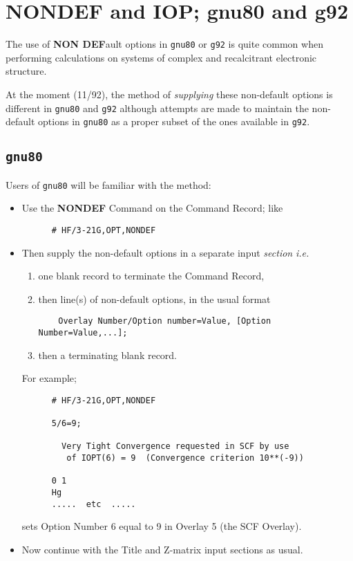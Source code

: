 
\section{\sf NONDEF and IOP; gnu80 and g92}
The use of {\bf NON DEF}ault options in {\tt gnu80} or {\tt g92} is quite
common when performing calculations on systems of complex
and recalcitrant electronic structure.

At the moment (11/92), the method of {\em supplying} these non-default
options is different in {\tt gnu80} and {\tt g92} although attempts are
made to maintain the non-default options in {\tt gnu80} as a proper
subset of the ones available in {\tt g92}.
\subsection{\tt gnu80}
Users of {\tt gnu80} will be familiar with the method:
\begin{itemize}
\item
Use the {\bf NONDEF} Command on the Command Record; like
\begin{verbatim}
      # HF/3-21G,OPT,NONDEF
\end{verbatim}
\item
Then supply the non-default options in a separate input {\em section}
{\em i.e.} 
\begin{enumerate}
\item
one blank record to terminate the Command Record, 
\item
then
line(s) of non-default options, in the usual format
{\small
\begin{verbatim}
    Overlay Number/Option number=Value, [Option Number=Value,...];
\end{verbatim}
}
\item
then a terminating blank record. 
\end{enumerate}
For example;
\begin{verbatim}
      # HF/3-21G,OPT,NONDEF

      5/6=9;

        Very Tight Convergence requested in SCF by use
         of IOPT(6) = 9  (Convergence criterion 10**(-9))

      0 1
      Hg
      .....  etc  .....

\end{verbatim}
sets Option Number 6 equal to 9 in Overlay 5 (the SCF Overlay).
\item
Now continue with the Title and Z-matrix input sections as usual.
\end{itemize}
